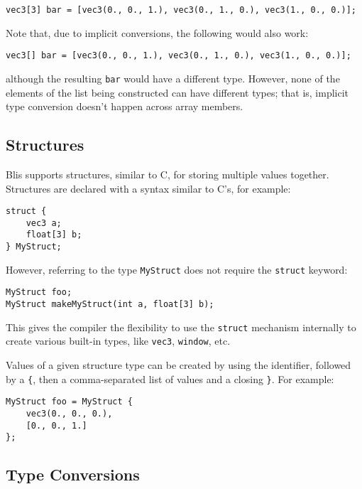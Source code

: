 \documentclass[11pt]{article}
\newcommand{\code}[1]{\texttt{#1}}
\begin{document}
\begin{lstlisting}
vec3[3] bar = [vec3(0., 0., 1.), vec3(0., 1., 0.), vec3(1., 0., 0.)];
\end{lstlisting}

Note that, due to implicit conversions, the following would also work:

\begin{lstlisting}
vec3[] bar = [vec3(0., 0., 1.), vec3(0., 1., 0.), vec3(1., 0., 0.)];
\end{lstlisting}

although the resulting \code{bar} would have a different type. However, none of the elements of the list being constructed can have different types; that is, implicit type conversion doesn't happen across array members.

\subsection{Structures}

Blis supports structures, similar to C, for storing multiple values together. Structures are declared with a syntax similar to C's, for example:

\begin{lstlisting}
struct {
	vec3 a;
	float[3] b;
} MyStruct;
\end{lstlisting}

However, referring to the type \code{MyStruct} does not require the \code{struct} keyword:

\begin{lstlisting}
MyStruct foo;
MyStruct makeMyStruct(int a, float[3] b);
\end{lstlisting}

This gives the compiler the flexibility to use the \code{struct} mechanism internally to create various built-in types, like \code{vec3}, \code{window}, etc.

Values of a given structure type can be created by using the identifier, followed by a \code{\{}, then a comma-separated list of values and a closing \code{\}}. For example:

\begin{lstlisting}
MyStruct foo = MyStruct {
	vec3(0., 0., 0.),
	[0., 0., 1.]
};
\end{lstlisting}

\subsection{Type Conversions} \label{conversions}
\end{document}
